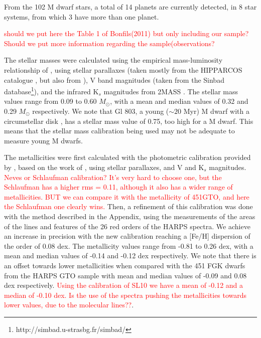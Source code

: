 \documentclass[structabstract]{aa}
\begin{document}
From the 102 M dwarf stars, a total of 14 planets are currently detected, in 8 star systems, from which 3 have more than one planet. 

\textcolor{red}{should we put here the Table 1 of Bonfils(2011) but only including our sample? Should we put more information regarding the sample(observations?}

The stellar masses were calculated using the empirical mass-luminosity relationship of \citet{Delfosse-2000}, using stellar parallaxes (taken mostly from the HIPPARCOS catalogue \citep{van_Leeuwen-2007} , but also from \citet{van_Altena-1995, Jahreiss-1997, Hawley-1997, Henry-2006}), V band magnitudes (taken from the Sinbad database\footnote{http://simbad.u-strasbg.fr/simbad/}), and the infrared K$_{s}$ magnitudes from 2MASS \citep{Skrutskie-2006}. The stellar mass values range from 0.09 to 0.60 $M_{\odot}$, with a mean and median values of 0.32 and 0.29 $M_{\odot}$ respectively. We note that Gl 803, a young ($\sim 20$ Myr) M dwarf with a circumstellar disk \citep{Kalas-2004}, has a stellar mass value of 0.75, too high for a M dwarf. This means that the stellar mass calibration being used may not be adequate to measure young M dwarfs. 

The metallicities were first calculated with the photometric calibration provided by \citet{Neves-2012}, based on the work of \citet{Schlaufman-2010}, using stellar parallaxes, and V and K$_{s}$ magnitudes. \textcolor{red}{Neves or Schlaufman calibration? It's very hard to choose one, but the Schlaufman has a higher rms = 0.11, although it also has a wider range of metallicities. BUT we can compare it with the metallicity of 451GTO, and here the Schlaufman one clearly wins.} Then, a refinement of this calibration was done with the method described in the Appendix, using the measurements of the areas of the lines and features of the 26 red orders of the HARPS spectra. We achieve an increase in precision with the new calibration reaching a [Fe/H] dispersion of the order of 0.08 dex. The metallicity values range from -0.81 to 0.26 dex, with a mean and median values of -0.14 and -0.12 dex respectively. We note that there is an offset towards lower metallicities when compared with the 451 FGK dwarfs from the HARPS GTO sample \citep{Sousa-2008} with mean and median values of -0.09 and 0.08 dex respectively. \textcolor{red}{Using the calibration of SL10 we have a mean of -0.12 and a median of -0.10 dex. Is the use of the spectra pushing the metallicities towards lower values, due to the molecular lines??}.
\end{document}
